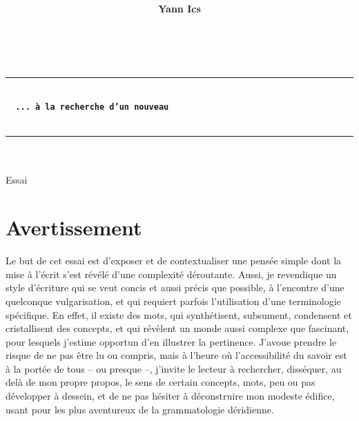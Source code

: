 \documentclass{article}
\title{%
}
\author{\textsf{\textbf{Yann Ics}}}
\date{}
\begin{document}

\makeatletter
  \begin{titlepage}
  \centering
  {\Large \@author} \\
  \rule{\linewidth}{.5pt}
  \vspace{4cm}
  
  {\LARGE \textbf{\@title}} \\
   \vspace{6 mm}
   {\color{brown} {\Large \textbf{\texttt{\, ... à la recherche d'un nouveau}}}}\\
   \vspace{2mm}
   {}\\
  \vfill
  \rule{\linewidth}{.5pt}
     {\Large \textsf{\textsl{}}}\\ 
          {\Large \textsf{\textsl{}}}\\ 

      {\Large \textsf{Essai}}\\

 \end{titlepage}
\makeatother


\pagecolor{white}



\renewcommand\thelinenumber{\color{purple}\arabic{linenumber}}
\linenumbers
  
\section{Avertissement}

Le but de cet essai est d'exposer et de contextualiser une pensée simple dont la mise à l'écrit s'est révélé d'une complexité déroutante. Aussi, je revendique un style d'écriture qui se veut concis et aussi précis que possible, à l'encontre d'une quelconque vulgarisation,  et qui requiert parfois l'utilisation d'une terminologie spécifique. En effet, il existe des mots, qui synthétisent, subsument, condensent et cristallisent des concepts, et qui révèlent un monde aussi complexe que fascinant, pour lesquels j'estime opportun d'en illustrer la pertinence. J'avoue prendre le risque de ne pas être lu ou compris, mais à l'heure où l'accessibilité du savoir est à la portée de tous -- ou presque --, j'invite le lecteur à rechercher, disséquer, au delà de mon propre propos, le sens de certain concepts, mots, peu ou pas développer à dessein, et de ne pas hésiter à déconstruire mon modeste édifice, usant pour les plus aventureux de la grammatologie déridienne.
\end{document}
